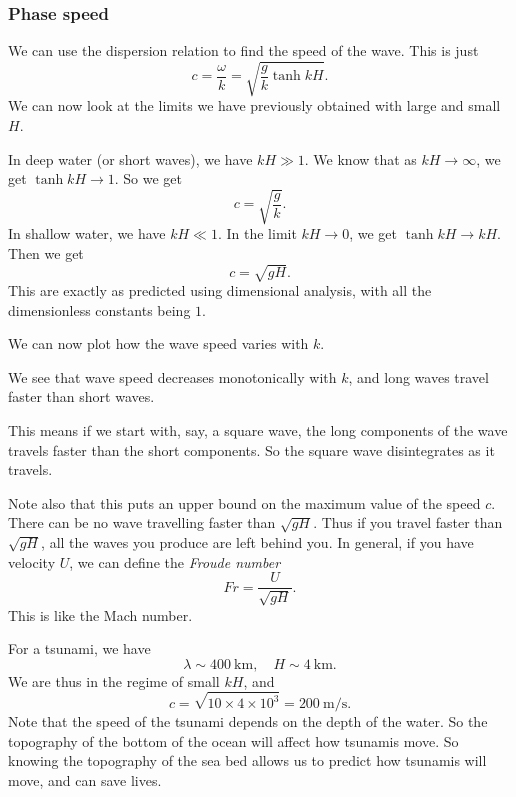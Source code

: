 \documentclass[a4paper]{article}
\begin{document}
\subsubsection{Phase speed}
We can use the dispersion relation to find the speed of the wave. This is just
\[
  c = \frac{\omega}{k} = \sqrt{\frac{g}{k}\tanh kH}.
\]
We can now look at the limits we have previously obtained with large and small $H$.

In deep water (or short waves), we have $kH \gg 1$. We know that as $kH \to \infty$, we get $\tanh kH \to 1$. So we get
\[
  c = \sqrt{\frac{g}{k}}.
\]
In shallow water, we have $kH \ll 1$. In the limit $kH \to 0$, we get $\tanh kH \to kH$. Then we get
\[
  c = \sqrt{gH}.
\]
This are exactly as predicted using dimensional analysis, with all the dimensionless constants being $1$.

We can now plot how the wave speed varies with $k$.
\begin{center}
\end{center}
We see that wave speed decreases monotonically with $k$, and long waves travel faster than short waves.

This means if we start with, say, a square wave, the long components of the wave travels faster than the short components. So the square wave disintegrates as it travels.

Note also that this puts an upper bound on the maximum value of the speed $c$. There can be no wave travelling faster than $\sqrt{gH}$. Thus if you travel faster than $\sqrt{gH}$, all the waves you produce are left behind you. In general, if you have velocity $U$, we can define the \emph{Froude number}
\[
  Fr = \frac{U}{\sqrt{gH}}.
\]
This is like the Mach number.

For a tsunami, we have
\[
  \lambda \sim \SI{400}{\kilo\meter},\quad H \sim \SI{4}{\kilo\meter}.
\]
We are thus in the regime of small $kH$, and
\[
  c = \sqrt{10 \times 4\times 10^3} = \SI{200}{\meter\per\second}.
\]
Note that the speed of the tsunami depends on the depth of the water. So the topography of the bottom of the ocean will affect how tsunamis move. So knowing the topography of the sea bed allows us to predict how tsunamis will move, and can save lives.
\end{document}
